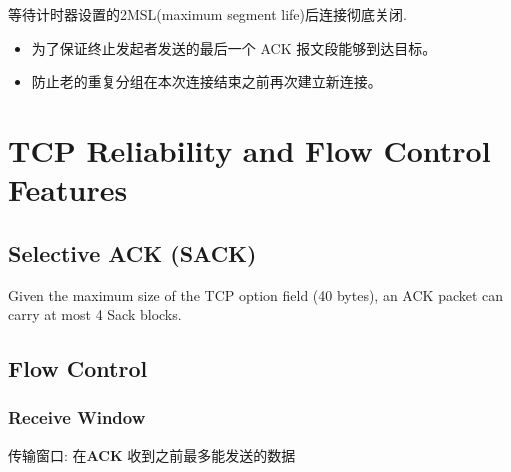 \documentclass[a4paper]{report}
\begin{document}
等待计时器设置的2MSL(maximum segment life)后连接彻底关闭. 
\begin{itemize}
  \item 为了保证终止发起者发送的最后一个 ACK 报文段能够到达目标。
  \item 防止老的重复分组在本次连接结束之前再次建立新连接。
\end{itemize}
\section{TCP Reliability and Flow Control Features}





\subsection{Selective ACK (SACK)}
Given the maximum size of the TCP option field (40 bytes), an ACK packet can carry at most 4 Sack blocks. 

\subsection{Flow Control}
\subsubsection{Receive Window}
\label{sec:tcp_rwnd}
传输窗口: 在\textbf{ACK} 收到之前最多能发送的数据
\end{document}
